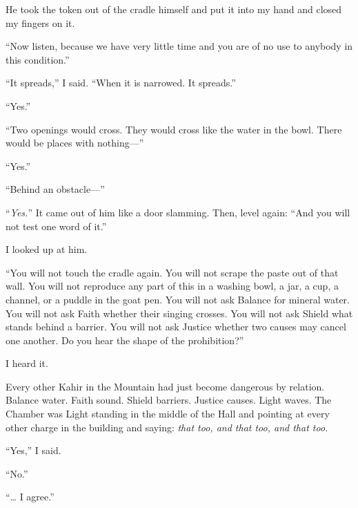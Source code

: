 He took the token out of the cradle himself and put it into my hand and closed my fingers on it.\par

``Now listen, because we have very little time and you are of no use to anybody in this condition.''\par

``It spreads,'' I said. ``When it is narrowed. It spreads.''\par

``Yes.''\par

``Two openings would cross. They would cross like the water in the bowl. There would be places with nothing---''\par

``Yes.''\par

``Behind an obstacle---''\par

``\textit{Yes.}'' It came out of him like a door slamming. Then, level again: ``And you will not test one word of it.''\par

I looked up at him.\par

``You will not touch the cradle again. You will not scrape the paste out of that wall. You will not reproduce any part of this in a washing bowl, a jar, a cup, a channel, or a puddle in the goat pen. You will not ask Balance for mineral water. You will not ask Faith whether their singing crosses. You will not ask Shield what stands behind a barrier. You will not ask Justice whether two causes may cancel one another. Do you hear the shape of the prohibition?''\par

I heard it.\par

Every other Kahir in the Mountain had just become dangerous by relation. Balance water. Faith sound. Shield barriers. Justice causes. Light waves. The Chamber was Light standing in the middle of the Hall and pointing at every other charge in the building and saying: \textit{that too, and that too, and that too.}\par

``Yes,'' I said.\par

``No.''\par

``\ldots{} I agree.''\par

